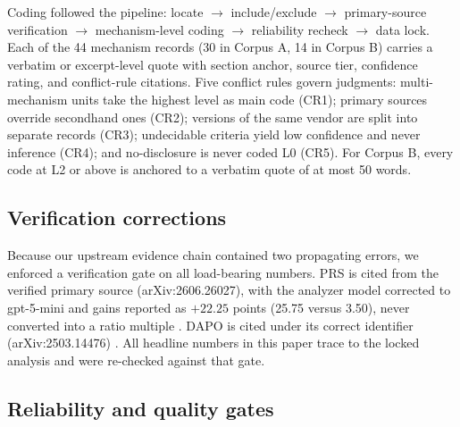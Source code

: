 \documentclass[10pt]{article}
\begin{document}
Coding followed the pipeline: locate $\rightarrow$ include/exclude $\rightarrow$ primary-source verification $\rightarrow$ mechanism-level coding $\rightarrow$ reliability recheck $\rightarrow$ data lock. Each of the 44 mechanism records (30 in Corpus A, 14 in Corpus B) carries a verbatim or excerpt-level quote with section anchor, source tier, confidence rating, and conflict-rule citations. Five conflict rules govern judgments: multi-mechanism units take the highest level as main code (CR1); primary sources override secondhand ones (CR2); versions of the same vendor are split into separate records (CR3); undecidable criteria yield low confidence and never inference (CR4); and no-disclosure is never coded L0 (CR5). For Corpus B, every code at L2 or above is anchored to a verbatim quote of at most 50 words.

\subsection{Verification corrections}

Because our upstream evidence chain contained two propagating errors, we enforced a verification gate on all load-bearing numbers. PRS is cited from the verified primary source (arXiv:2606.26027), with the analyzer model corrected to gpt-5-mini and gains reported as $+22.25$ points (25.75 versus 3.50), never converted into a ratio multiple \cite{hao2026prs}. DAPO is cited under its correct identifier (arXiv:2503.14476) \cite{yu2025dapo}. All headline numbers in this paper trace to the locked analysis and were re-checked against that gate.

\subsection{Reliability and quality gates}
\end{document}
